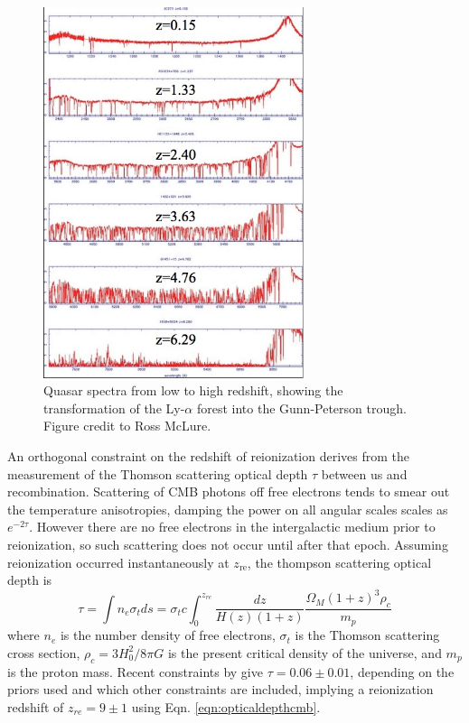 \begin{figure}
	\centering
	\includegraphics[width=3in]{chap0_intro/lymanalpha_diffz.jpg}
	\caption[Quasar spectra from low to high redshift, showing the transformation of the Ly-$\alpha$ forest into the Gunn-Peterson trough.]{Quasar spectra from low to high redshift, showing the transformation of the Ly-$\alpha$ forest into the Gunn-Peterson trough. Figure credit to Ross McLure.}
	\label{fig:lya}
\end{figure}

An orthogonal constraint on the redshift of reionization derives from the measurement of the Thomson scattering optical depth $\tau$ between us and recombination. Scattering of CMB photons off free electrons tends to smear out the temperature anisotropies, damping the power on all angular scales scales as $e^{-2\tau}$. However there are no free electrons in the intergalactic medium prior to reionization, so such scattering does not occur until after that epoch.  Assuming reionization occurred instantaneously at $z_\text{re}$, the thompson scattering optical depth is 
\begin{equation}
\label{eqn:opticaldepthcmb}
	\tau=\int n_e\sigma_t ds=\sigma_t c\int_0^{z_{re}}\frac{dz}{H(z)(1+z)}\frac{\Omega_M(1+z)^3\rho_c}{m_p}
\end{equation}
where $n_e$ is the number density of free electrons, $\sigma_t$ is the Thomson scattering cross section, $\rho_c=3H_0^2/8\pi G$ is the present critical density of the universe, and $m_p$ is the proton mass. Recent constraints by \citep{plancktau16} give  $\tau=0.06\pm0.01$, depending on the priors used and which other constraints are included, implying a reionization redshift of $z_{re}=9\pm1$ using Eqn. \ref{eqn:opticaldepthcmb}.

